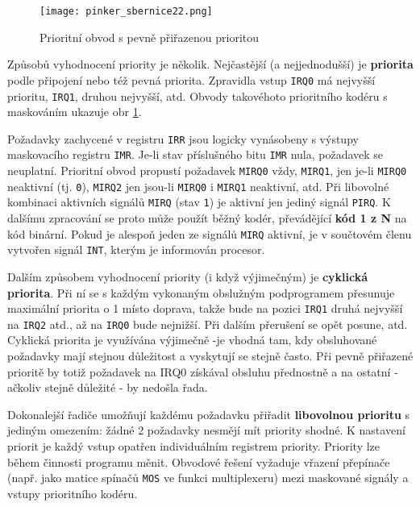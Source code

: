       \begin{figure}[ht!] %
        \centering
        \texttt{[image: pinker\_sbernice22.png]}
        \caption{Prioritní obvod s pevně přiřazenou prioritou}
        \label{MIT:fig_sbernice22}
      \end{figure}

      Způsobů vyhodnocení priority je několik. Nejčastější (a nejjednodušší) je \textbf{priorita} 
      podle připojení nebo též pevná priorita. Zpravidla vstup \texttt{IRQ0} má nejvyšší prioritu, 
      \texttt{IRQ1}, druhou nejvyšší, atd. Obvody takovéhoto prioritního kodéru s maskováním 
      ukazuje obr \ref{MIT:fig_sbernice22}.
      
      Požadavky zachycené v registru \texttt{IRR} jsou logicky vynásobeny s výstupy maskovacího 
      registru \texttt{IMR}. Je-li stav příslušného bitu \texttt{IMR} nula, požadavek se neuplatní. 
      Prioritní obvod  propustí požadavek \texttt{MIRQ0} vždy, \texttt{MIRQ1}, jen je-li 
      \texttt{MIRQ0} neaktivní (tj. \texttt{0}), \texttt{MIRQ2} jen jsou-li \texttt{MIRQ0} i 
      \texttt{MIRQ1} neaktivní, atd. Při libovolné kombinaci aktivních signálů \texttt{MIRQ} (stav 
      \texttt{1}) je aktivní jen jediný signál \texttt{PIRQ}. K dalšímu zpracování se proto může 
      použít běžný kodér, převádějící \textbf{kód 1 z N} na kód binární. Pokud je alespoň jeden ze 
      signálů \texttt{MIRQ} aktivní, je v součtovém členu vytvořen signál \texttt{INT}, kterým je 
      informován procesor.
      
      Dalším způsobem vyhodnocení priority (i když výjimečným) je \textbf{cyklická priorita}. Při 
      ní se s každým vykonaným obslužným podprogramem přesunuje maximální priorita o 1 místo 
      doprava, takže bude na pozici \texttt{IRQ1} druhá nejvyšší na \texttt{IRQ2} atd., až na 
      \texttt{IRQ0} bude nejnižší. Při dalším přerušení se opět posune, atd. Cyklická priorita je 
      využívána výjimečně -je vhodná tam, kdy obsluhované požadavky mají stejnou důležitost a 
      vyskytují se stejně často. Při pevně přiřazené prioritě by totiž požadavek na IRQ0 získával 
      obsluhu přednostně a na ostatní - ačkoliv stejně důležité - by nedošla řada.
      
      Dokonalejší řadiče umožňují každému požadavku přiřadit \textbf{libovolnou prioritu} s jediným 
      omezením: žádné 2 požadavky nesmějí mít priority shodné. K nastavení priorit je každý vstup 
      opatřen individuálním registrem priority. Priority lze během činnosti programu měnit. 
      Obvodové řešení vyžaduje vřazení přepínače (např. jako matice spínačů \texttt{MOS} ve funkci 
      multiplexeru) mezi maskované signály a vstupy prioritního kodéru.
      
